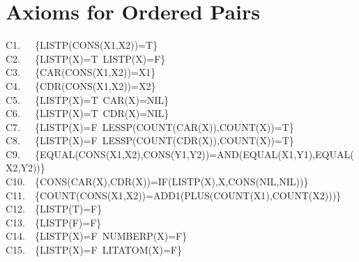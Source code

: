 \documentclass[11pt]{book}
\newenvironment{pubasis}{\begin{flushleft}\ttfamily\small}{\normalsize\rmfamily\end{flushleft}}
\newcommand{\pubdefaulttextsize}{\large}
\begin{document}
\section{Axioms for Ordered Pairs}
\pubdefaulttextsize
\begin{pubasis}
C1.~~~\{LISTP(CONS(X1,X2))=T\}\\

C2.~~~\{LISTP(X)=T~LISTP(X)=F\}\\

C3.~~~\{CAR(CONS(X1,X2))=X1\}\\

C4.~~~\{CDR(CONS(X1,X2))=X2\}\\

C5.~~~\{LISTP(X)=T~CAR(X)=NIL\}\\

C6.~~~\{LISTP(X)=T~CDR(X)=NIL\}\\

C7.~~~\{LISTP(X)=F~LESSP(COUNT(CAR(X)),COUNT(X))=T\}\\

C8.~~~\{LISTP(X)=F~LESSP(COUNT(CDR(X)),COUNT(X))=T\}\\

C9.~~~\{EQUAL(CONS(X1,X2),CONS(Y1,Y2))=AND(EQUAL(X1,Y1),EQUAL(X2,Y2))\}\\

C10.~~\{CONS(CAR(X),CDR(X))=IF(LISTP(X),X,CONS(NIL,NIL))\}\\

C11.~~\{COUNT(CONS(X1,X2))=ADD1(PLUS(COUNT(X1),COUNT(X2)))\}\\

C12.~~\{LISTP(T)=F\}\\

C13.~~\{LISTP(F)=F\}\\

C14.~~\{LISTP(X)=F~NUMBERP(X)=F\}\\

C15.~~\{LISTP(X)=F~LITATOM(X)=F\}\\
\end{pubasis}
\end{document}
